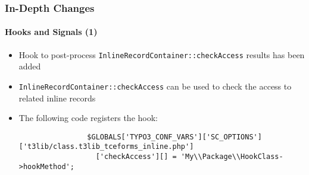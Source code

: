 \begin{frame}[fragile]
	\frametitle{In-Depth Changes}
	\framesubtitle{Hooks and Signals (1)}

	\lstset{basicstyle=\tiny\ttfamily}

	\begin{itemize}

		\item Hook to post-process \texttt{InlineRecordContainer::checkAccess} results has been added

		\item \texttt{InlineRecordContainer::checkAccess} can be used to check the access to related inline records

		\item The following code registers the hook:

			\begin{lstlisting}
				$GLOBALS['TYPO3_CONF_VARS']['SC_OPTIONS']['t3lib/class.t3lib_tceforms_inline.php']
				  ['checkAccess'][] = 'My\\Package\\HookClass->hookMethod';
			\end{lstlisting}

	\end{itemize}

\end{frame}


